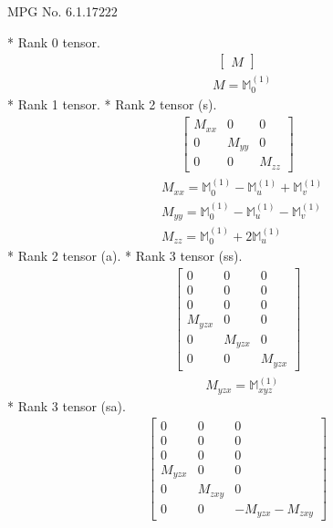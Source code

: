 \documentclass[fleqn,8pt,landscape]{jsarticle}
\begin{document}
\setcounter{MaxMatrixCols}{32}

\renewcommand{\tablename}{Table~}
\renewcommand{\figurename}{Figure~}
\begin{center}
\LARGE
MPG No. 6.1.17\quad$222$
\end{center}
* Rank 0 tensor.
\begin{align*}
\begin{bmatrix} M \end{bmatrix}
\end{align*}
\begin{align*}
& M = \mathbb{M}_{0}^{(1)}
\end{align*}
* Rank 1 tensor.
* Rank 2 tensor (s).
\begin{align*}
\begin{bmatrix} M_{xx} & 0 & 0 \\ 0 & M_{yy} & 0 \\ 0 & 0 & M_{zz} \end{bmatrix}
\end{align*}
\begin{align*}
& M_{xx} = \mathbb{M}_{0}^{(1)} - \mathbb{M}_{u}^{(1)} + \mathbb{M}_{v}^{(1)} \\
& M_{yy} = \mathbb{M}_{0}^{(1)} - \mathbb{M}_{u}^{(1)} - \mathbb{M}_{v}^{(1)} \\
& M_{zz} = \mathbb{M}_{0}^{(1)} + 2 \mathbb{M}_{u}^{(1)}
\end{align*}
* Rank 2 tensor (a).
* Rank 3 tensor (ss).
\begin{align*}
\begin{bmatrix} 0 & 0 & 0 \\ 0 & 0 & 0 \\ 0 & 0 & 0 \\ M_{yzx} & 0 & 0 \\ 0 & M_{yzx} & 0 \\ 0 & 0 & M_{yzx} \end{bmatrix}
\end{align*}
\begin{align*}
& M_{yzx} = \mathbb{M}_{xyz}^{(1)}
\end{align*}
* Rank 3 tensor (sa).
\begin{align*}
\begin{bmatrix} 0 & 0 & 0 \\ 0 & 0 & 0 \\ 0 & 0 & 0 \\ M_{yzx} & 0 & 0 \\ 0 & M_{zxy} & 0 \\ 0 & 0 & - M_{yzx} - M_{zxy} \end{bmatrix}
\end{align*}
\end{document}

